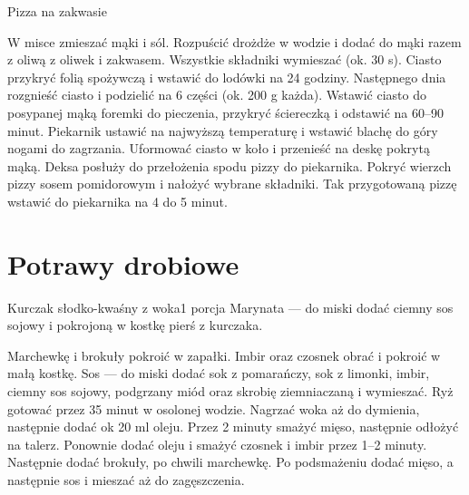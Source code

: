 \documentclass[a4paper,12pt]{article}
\begin{document}
\begin{recipe}{Pizza na zakwasie}{}{}

W misce zmieszać mąki i sól. Rozpuścić drożdże w wodzie i dodać do mąki
razem z oliwą z oliwek i zakwasem. Wszystkie składniki wymieszać (ok. 30 s).
Ciasto przykryć folią spożywczą i wstawić do lodówki na 24 godziny.
\freeform%
Następnego dnia rozgnieść ciasto i podzielić na 6 części (ok. 200 g każda).
Wstawić ciasto do posypanej mąką foremki do pieczenia, przykryć ściereczką i
odstawić na 60--90 minut. Piekarnik ustawić na najwyższą temperaturę i wstawić
blachę do góry nogami do zagrzania. Uformować ciasto w koło i przenieść na
deskę pokrytą mąką. Deksa posłuży do przełożenia spodu pizzy do
piekarnika. Pokryć wierzch pizzy sosem pomidorowym i nałożyć wybrane składniki.
Tak przygotowaną pizzę wstawić do piekarnika na 4 do 5 minut.

\end{recipe}

\newpage
\section{Potrawy drobiowe}

\begin{recipe}{Kurczak słodko-kwaśny z woka}{1 porcja}{}
Marynata --- do miski dodać ciemny sos sojowy i pokrojoną w kostkę pierś z
kurczaka.

Marchewkę i brokuły pokroić w zapałki. Imbir oraz czosnek obrać i pokroić w małą
kostkę. 
Sos --- do miski dodać sok z pomarańczy, sok z limonki, imbir, ciemny sos
sojowy, podgrzany miód oraz skrobię ziemniaczaną i wymieszać.
Ryż gotować przez 35 minut w osolonej wodzie.
\freeform%
Nagrzać woka aż do dymienia, następnie dodać ok 20 ml oleju. Przez 2 minuty
smażyć mięso, następnie odłożyć na talerz. Ponownie dodać oleju i smażyć
czosnek i imbir przez 1--2 minuty. Następnie dodać brokuły, po chwili
marchewkę. Po podsmażeniu dodać mięso, a następnie sos i mieszać aż do
zagęszczenia.

\end{recipe}
\end{document}
